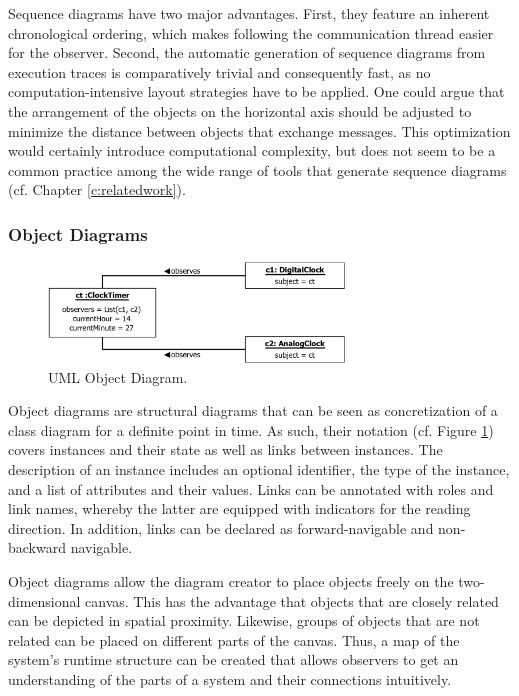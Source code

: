 Sequence diagrams have two major advantages.
First, they feature an inherent chronological ordering, which makes following the communication thread easier for the observer.
Second, the automatic generation of sequence diagrams from execution traces is comparatively trivial and consequently fast, as no computation-intensive layout strategies have to be applied.
One could argue that the arrangement of the objects on the horizontal axis should be adjusted to minimize the distance between objects that exchange messages.
This optimization would certainly introduce computational complexity, but does not seem to be a common practice among the wide range of tools that generate sequence diagrams (cf. Chapter \ref{c:relatedwork}).

\subsubsection{Object Diagrams}

\begin{figure}
	\centering
	\includegraphics[width=0.7\textwidth]{../images/02-Object}
	\caption{UML Object Diagram.}
	\label{fig:BackgroundModelingObject}
\end{figure}

Object diagrams \cite{rumbaugh_unified_2010} are structural diagrams that can be seen as concretization of a class diagram for a definite point in time.
As such, their notation (cf. Figure \ref{fig:BackgroundModelingObject}) covers instances and their state as well as links between instances.
The description of an instance includes an optional identifier, the type of the instance, and a list of attributes and their values.
Links can be annotated with roles and link names, whereby the latter are equipped with indicators for the reading direction.
In addition, links can be declared as forward-navigable and non-backward navigable.

Object diagrams allow the diagram creator to place objects freely on the two-dimensional canvas.
This has the advantage that objects that are closely related can be depicted in spatial proximity.
Likewise, groups of objects that are not related can be placed on different parts of the canvas.
Thus, a map of the system's runtime structure can be created that allows observers to  get an understanding of the parts of a system and their connections intuitively.

